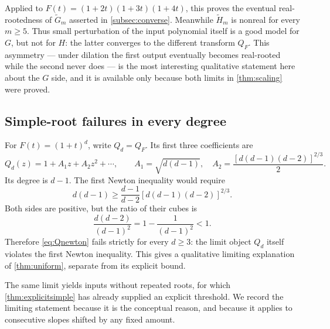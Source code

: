 \documentclass[11pt,letterpaper]{article}
\numberwithin{equation}{section}
\theoremstyle{definition}
\theoremstyle{remark}
\begin{document}
Applied to $F(t)=(1+2t)(1+3t)(1+4t)$, this proves the eventual
real-rootedness of $\widetilde G_m$ asserted in \cref{subsec:converse}.
Meanwhile $\widetilde H_m$ is nonreal for every $m\ge5$. Thus small
perturbation of the input polynomial itself is a good model for $G$, but not
for $H$: the latter converges to the different transform $Q_F$. This
asymmetry --- under dilation the first output eventually becomes real-rooted
while the second never does --- is the most interesting qualitative statement
here about the $G$ side, and it is available only because both limits in
\cref{thm:scaling} were proved.

\subsection{Simple-root failures in every degree}
\label{subsec:everydegreelimit}

For $F(t)=(1+t)^d$, write $Q_d=Q_F$. Its first three coefficients are
\begin{equation}\label{eq:Qdcoeff}
 Q_d(z)=1+A_1z+A_2z^2+\cdots,
 \qquad
 A_1=\sqrt{d(d-1)},\quad
 A_2=\frac{[d(d-1)(d-2)]^{2/3}}2.
\end{equation}
Its degree is $d-1$. The first Newton inequality would require
\begin{equation}\label{eq:Qnewton}
 d(d-1)\ge
 \frac{d-1}{d-2}[d(d-1)(d-2)]^{2/3}.
\end{equation}
Both sides are positive, but the ratio of their cubes is
\begin{equation}\label{eq:ratiolimit}
 \frac{d(d-2)}{(d-1)^2}=1-\frac1{(d-1)^2}<1.
\end{equation}
Therefore \eqref{eq:Qnewton} fails strictly for every $d\ge3$: the limit
object $Q_d$ itself violates the first Newton inequality. This gives a
qualitative limiting explanation of \cref{thm:uniform}, separate from its
explicit bound.

The same limit yields inputs without repeated roots, for which
\cref{thm:explicitsimple} has already supplied an explicit threshold. We
record the limiting statement because it is the conceptual reason, and because
it applies to consecutive slopes shifted by any fixed amount.
\end{document}
